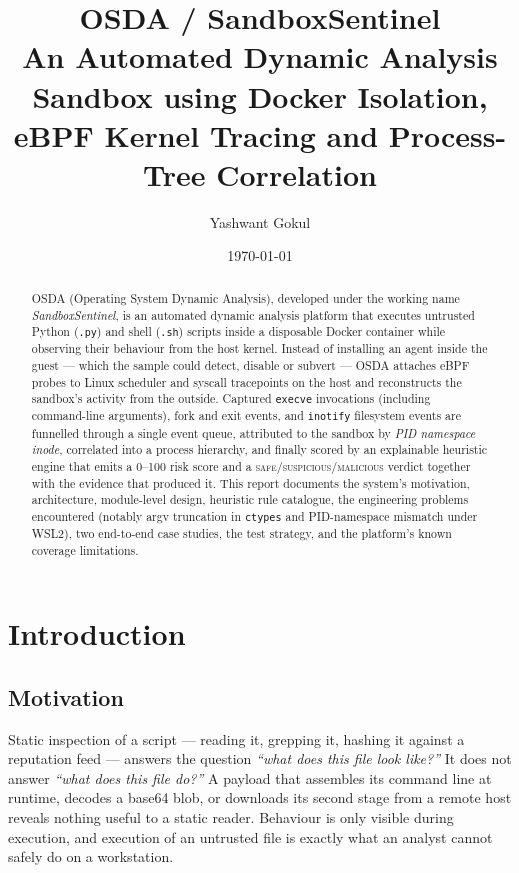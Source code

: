 \documentclass[11pt,a4paper]{article}
\title{\textbf{OSDA / SandboxSentinel}\\[6pt]
\large An Automated Dynamic Analysis Sandbox using Docker Isolation,\\
eBPF Kernel Tracing and Process-Tree Correlation}
\author{Yashwant Gokul}
\date{\today}
\newcommand{\code}[1]{\texttt{\small #1}}
\begin{document}
\maketitle

\begin{abstract}
\noindent
OSDA (Operating System Dynamic Analysis), developed under the working name
\emph{SandboxSentinel}, is an automated dynamic analysis platform that executes
untrusted Python (\code{.py}) and shell (\code{.sh}) scripts inside a disposable
Docker container while observing their behaviour from the host kernel. Instead of
installing an agent inside the guest --- which the sample could detect, disable or
subvert --- OSDA attaches eBPF probes to Linux scheduler and syscall tracepoints on
the host and reconstructs the sandbox's activity from the outside. Captured
\code{execve} invocations (including command-line arguments), fork and exit events,
and \code{inotify} filesystem events are funnelled through a single event queue,
attributed to the sandbox by \emph{PID namespace inode}, correlated into a process
hierarchy, and finally scored by an explainable heuristic engine that emits a
0--100 risk score and a \textsc{safe}/\textsc{suspicious}/\textsc{malicious}
verdict together with the evidence that produced it. This report documents the
system's motivation, architecture, module-level design, heuristic rule catalogue,
the engineering problems encountered (notably argv truncation in \code{ctypes} and
PID-namespace mismatch under WSL2), two end-to-end case studies, the test strategy,
and the platform's known coverage limitations.
\end{abstract}

\tableofcontents
\newpage

\section{Introduction}

\subsection{Motivation}
Static inspection of a script --- reading it, grepping it, hashing it against a
reputation feed --- answers the question \emph{``what does this file look like?''}
It does not answer \emph{``what does this file do?''} A payload that assembles its
command line at runtime, decodes a base64 blob, or downloads its second stage from
a remote host reveals nothing useful to a static reader. Behaviour is only visible
during execution, and execution of an untrusted file is exactly what an analyst
cannot safely do on a workstation.
\end{document}
